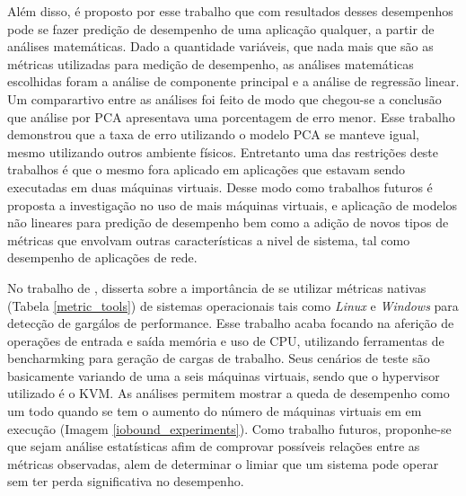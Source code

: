Além disso, é proposto por esse trabalho que com resultados desses desempenhos pode se fazer predição de desempenho de uma aplicação qualquer, a partir de análises matemáticas. Dado a quantidade variáveis, que nada mais que são as métricas utilizadas para medição de desempenho, as análises matemáticas escolhidas foram a análise de componente principal e a análise de regressão linear. Um comparartivo entre as análises foi feito de modo que chegou-se a conclusão que análise por PCA apresentava uma porcentagem de erro menor. Esse trabalho demonstrou que a taxa de erro utilizando o modelo PCA se manteve igual, mesmo utilizando outros ambiente físicos. Entretanto uma das restrições deste trabalhos é que o mesmo fora aplicado em aplicações que estavam sendo executadas em duas máquinas virtuais. Desse modo como trabalhos futuros é proposta a investigação no uso de mais máquinas virtuais, e aplicação de modelos não lineares para predição de desempenho bem como a adição de novos tipos de métricas que envolvam outras características a nivel de sistema, tal como desempenho de aplicações de rede.

No trabalho de , disserta sobre a importância de se utilizar métricas nativas (Tabela \ref{metric_tools}) de sistemas  operacionais tais como \textit{Linux} e \textit{Windows} para detecção de gargálos de performance. Esse trabalho acaba focando na aferição de operações de entrada e saída memória e uso de CPU, utilizando ferramentas de bencharmking para geração de cargas de trabalho. Seus cenários de teste são basicamente variando de uma a seis máquinas virtuais, sendo que o hypervisor utilizado é o KVM. As análises permitem mostrar a queda de desempenho como um todo quando se tem o aumento do número de máquinas virtuais em em execução (Imagem \ref{iobound_experiments}). Como trabalho futuros, proponhe-se que sejam análise estatísticas afim de comprovar possíveis relações entre as métricas observadas, alem de determinar o limiar que um sistema pode operar sem ter perda significativa no desempenho.

